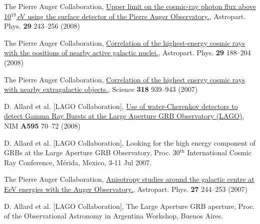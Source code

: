 \begin{etaremune}
\item {}The Pierre Auger Collaboration,
\href{http://dx.doi.org/10.1016/j.astropartphys.2008.01.003}{{Upper limit
on the cosmic-ray photon flux above 10$^{19}$\,eV using the surface detector of
the Pierre Auger Observatory.}}, Astropart. Phys. {\bf 29} 243--256 (2008)

\item {}The Pierre Auger Collaboration,
\href{http://dx.doi.org/10.1016/j.astropartphys.2008.01.002}{{Correlation
of the highest-energy cosmic rays with the positions of nearby active galactic
nuclei.}}, Astropart. Phys. {\bf 29} 188--204 (2008)

\item {}The Pierre Auger Collaboration,
\href{http://dx.doi.org/10.1126/science.1151124}{{Correlation of the
highest energy cosmic rays with nearby extragalactic objects.}}, Science {\bf
318} 939--943 (2007)

\item {}D. Allard { et al.} [LAGO Collaboration],
\href{http://dx.doi.org/10.1016/j.nima.2008.07.041}{{Use of
water-Cherenkov detectors to detect Gamma Ray Bursts at the Large Aperture GRB
Observatory (LAGO)}}, NIM {\bf A595} 70--72 (2008)

\item {}D. Allard { et al.} [LAGO Collaboration], {{Looking for
the high energy component of GRBs at the Large Aperture GRB Observatory}}, \en
Proc. 30$^{\mathrm{th}}$ International Cosmic Ray Conference,  Mérida, Mexico, 3-11 Jul
2007.

\item {}The Pierre Auger Collaboration,
\href{http://dx.doi.org/10.1016/j.astropartphys.2006.11.002}{{Anisotropy
studies around the galactic centre at EeV energies with the Auger
Observatory.}},  Astropart. Phys. {\bf 27} 244--253 (2007)

\item {}D. Allard { et al.} [LAGO Collaboration], {{The Large
Aperture GRB aperture}}, \en Proc. of the Observational Astronomy in Argentina
Workshop, Buenos Aires.

\end{etaremune}
